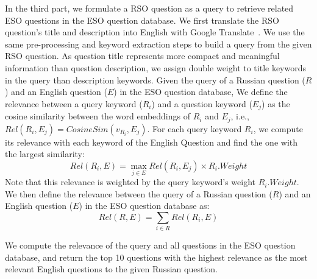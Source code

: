 In the third part, we formulate a RSO question as a query to retrieve related ESO questions in the ESO question database.
We first translate the RSO question's title and description into English with Google Translate~\cite{web:googleTranslate}.
We use the same pre-processing and keyword extraction steps to build a query from the given RSO question.
As question title represents more compact and meaningful information than question description, we assign double weight to title keywords in the query than description keywords.
Given the query of a Russian question ($R$) and an English question ($E$) in the ESO question database, We define the relevance between a query keyword ($R_i$) and a question keyword ($E_j$) as the cosine similarity between the word embeddings of $R_i$ and $E_j$, i.e., $Rel(R_i, E_j)=CosineSim(v_{R_i}, E_j)$. 
For each query keyword $R_i$, we compute its relevance with each keyword of the English Question and find the one with the largest similarity: 
\begin{equation}
Rel(R_i,E)=\max\limits_{j \in E}Rel(R_i, E_j)\times R_i.Weight
\end{equation}
Note that this relevance is weighted by the query keyword's weight $R_i.Weight$.
We then define the relevance between the query of a Russian question ($R$) and an English question ($E$) in the ESO question database as:
\begin{equation}
\label{equ:relevance}
Rel(R, E) = \sum_{i \in R}Rel(R_i, E)
\end{equation}

We compute the relevance of the query and all questions in the ESO question database, and return the top 10 questions with the highest relevance as the most relevant English questions to the given Russian question.

